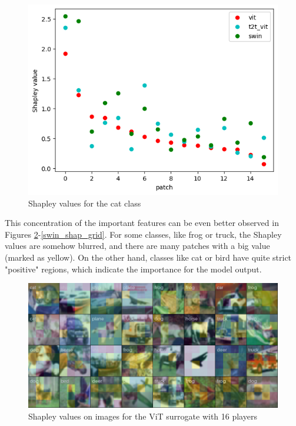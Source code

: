 \documentclass[en]{pracamgr}
\begin{document}
\begin{figure}[H]
\centering
\includegraphics[scale=0.5]{./images/Cat_shapley.png}
\caption{Shapley values for the cat class}
\label{Cat_shapley}
\end{figure}





This concentration of the important features can be even better observed in Figures \ref{vit_shap_grid}-\ref{swin_shap_grid}. For some classes, like frog or truck, the Shapley values are somehow blurred, and there are many patches with a big value (marked as yellow). On the other hand, classes like cat or bird have quite strict "positive" regions, which indicate the importance for the model output.



\pagebreak

\begin{figure}[H]
\centering
\includegraphics[scale=0.4]{./images/vit_shap_grid.png}
\caption{Shapley values on images for the ViT surrogate with 16 players}
\label{vit_shap_grid}
\end{figure}
\end{document}
